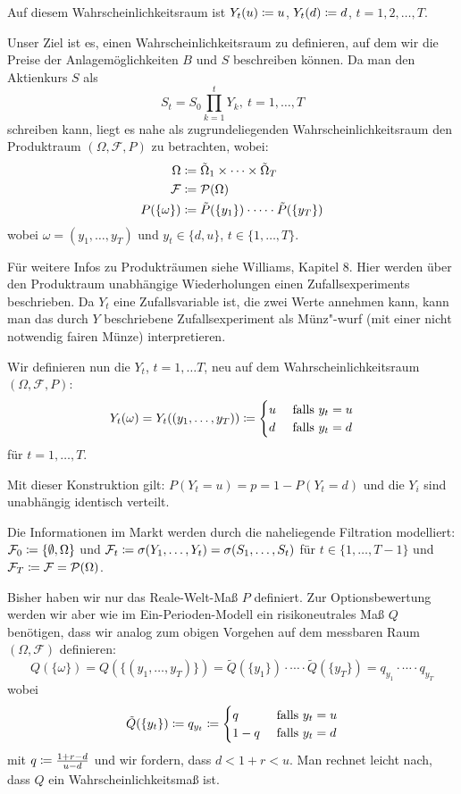 \documentclass[a4paper,twoside,DIV15,BCOR12mm]{scrbook}
\newcommand{\cF}{\mathcal F}
\begin{document}
Auf diesem Wahrscheinlichkeitsraum ist $Y_t(u)\da u$, $Y_t(d)\da d$, $t=1, 2,\ldots, T$.

 Unser Ziel ist es, einen Wahrscheinlichkeitsraum zu definieren, auf dem wir die Preise der Anlagemöglichkeiten $B$ und $S$ beschreiben können. Da man den Aktienkurs $S$ als
\[
S_t=S_0 \prod_{k=1}^t Y_k,\ t=1,\ldots, T
\]
schreiben kann, liegt es nahe als zugrundeliegenden Wahrscheinlichkeitsraum den Produktraum $(\Omega, \cF, P)$ zu betrachten, wobei:
\begin{align*}
\Omega &\da \tilde\Omega_1 \times \cdots \times \tilde\Omega_T \\ %
\cF &\da \mathcal{P}(\Omega) \\
P(\{\omega\}) &\da \tilde{P}(\{y_1\})\cdot \cdots\cdot \tilde{P}(\{y_T\})
\end{align*}
wobei $\omega=(y_1, \ldots, y_T)$ und $y_t \in \{d,u\}$, $t\in\{1,\ldots,T\}$.

Für weitere Infos zu Produkträumen siehe Williams, Kapitel 8. Hier werden über den Produktraum unabhängige Wiederholungen einen Zufallsexperiments beschrieben. Da $Y_t$ eine Zufallsvariable ist, die zwei Werte annehmen kann, kann man das durch $Y$ beschriebene Zufallsexperiment als Münz"-wurf (mit einer nicht notwendig fairen Münze) interpretieren.


 Wir definieren nun die $Y_t$, $t=1, \ldots T$, neu auf dem Wahrscheinlichkeitsraum $(\Omega, \cF , P)$:
\[
Y_t(\omega)=Y_t((y_1,\ldots,y_T))\da 
 \begin{cases}
 u & \mbox{ falls } y_t=u\\
 d & \mbox{ falls } y_t=d
 \end{cases}
\]
für $t=1, \ldots, T$.

 Mit dieser Konstruktion gilt: $P(Y_t=u)=p=1-P(Y_t=d)$ und die $Y_i$ sind unabhängig identisch verteilt.

 Die Informationen im Markt werden durch die naheliegende Filtration modelliert:
 $\cF_0\da \{\emptyset, \Omega\}$ und $\cF_t\da \sigma(Y_1,\ldots,Y_t)=\sigma(S_1,\ldots, S_t)$ für $t\in\{1,\ldots, T-1\}$ und $\cF_T\da \cF=\mathcal{P}(\Omega)$.

 Bisher haben wir nur das Reale-Welt-Maß $P$ definiert. Zur Optionsbewertung werden wir aber wie im Ein-Perioden-Modell ein risikoneutrales Maß $Q$ benötigen, dass wir analog zum obigen Vorgehen auf dem messbaren Raum $(\Omega, \cF)$ definieren:
\[
Q(\{\omega\}) = Q(\{(y_1,\ldots, y_T)\})=\tilde{Q}(\{y_1\}) \cdot\cdots\cdot \tilde{Q}(\{y_T\})=q_{y_1} \cdot\cdots\cdot q_{y_T}
\]
wobei
\[\tilde Q(\{y_t\})\da q_{y_t}\da
\begin{cases}
 q & \mbox{ falls } y_t=u\\
 1-q & \mbox{ falls } y_t=d
 \end{cases}
\]
mit $q\da \frac{1+r-d}{u-d}$ und wir fordern, dass $d<1+r<u$. Man rechnet leicht nach, dass $Q$ ein Wahrscheinlichkeitsmaß ist.
 
\end{document}
